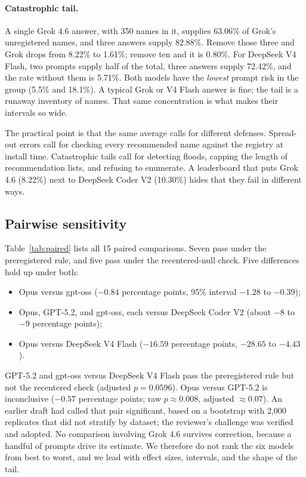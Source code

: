 \documentclass[10pt,twocolumn,letterpaper]{article}
\begin{document}
\paragraph{Catastrophic tail.} A single Grok 4.6 answer, with 350 names in it, supplies 63.06\% of
Grok's unregistered names, and three answers supply 82.88\%. Remove those three and Grok drops from
8.22\% to 1.61\%; remove ten and it is 0.80\%. For DeepSeek V4 Flash, two prompts supply half of the
total, three answers supply 72.42\%, and the rate without them is 5.71\%. Both models have the
\emph{lowest} prompt risk in the group (5.5\% and 18.1\%). A typical Grok or V4 Flash answer is fine;
the tail is a runaway inventory of names. That same concentration is what makes their intervals so
wide.

The practical point is that the same average calls for different defenses. Spread-out errors call for
checking every recommended name against the registry at install time. Catastrophic tails call for
detecting floods, capping the length of recommendation lists, and refusing to enumerate. A leaderboard
that puts Grok 4.6 (8.22\%) next to DeepSeek Coder V2 (10.30\%) hides that they fail in different
ways.

\subsection{Pairwise sensitivity}
\label{sec:pairwise}

Table~\ref{tab:paired} lists all 15 paired comparisons. Seven pass under the preregistered rule, and
five pass under the recentered-null check. Five differences hold up under both:
\begin{itemize}
\item Opus versus gpt-oss ($-0.84$ percentage points, 95\% interval $-1.28$ to $-0.39$);
\item Opus, GPT-5.2, and gpt-oss, each versus DeepSeek Coder V2 (about $-8$ to $-9$ percentage
  points);
\item Opus versus DeepSeek V4 Flash ($-16.59$ percentage points, $-28.65$ to $-4.43$).
\end{itemize}
GPT-5.2 and gpt-oss versus DeepSeek V4 Flash pass the preregistered rule but not the recentered check
(adjusted $p = 0.0596$). Opus versus GPT-5.2 is inconclusive ($-0.57$ percentage points; raw
$p \approx 0.008$, adjusted $\approx 0.07$). An earlier draft had called that pair significant, based
on a bootstrap with 2,000 replicates that did not stratify by dataset; the reviewer's challenge was
verified and adopted. No comparison involving Grok 4.6 survives correction, because a handful of
prompts drive its estimate. We therefore do not rank the six models from best to worst, and we lead
with effect sizes, intervals, and the shape of the tail.
\end{document}

